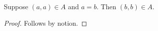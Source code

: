 \begin{proposition}\label{notion_equality_proper_subterm}
    Suppose $(a,a)\in A$ and $a=b$.
    Then $(b,b)\in A$.
\end{proposition}
\begin{proof}
    Follows by notion.
\end{proof}

